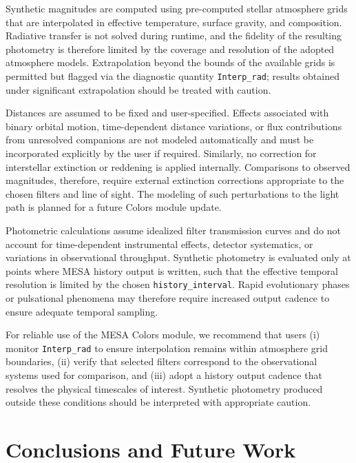 \documentclass[linenumbers,apj,twocolumn, floatfix]{aastex701}
\begin{document}
Synthetic magnitudes are computed using pre-computed stellar atmosphere grids that are interpolated in effective temperature, surface gravity, and composition.
Radiative transfer is not solved during runtime, and the fidelity of the resulting photometry is therefore limited by the coverage and resolution of the adopted atmosphere models.
Extrapolation beyond the bounds of the available grids is permitted but flagged via the diagnostic quantity \texttt{Interp\_rad}; results obtained under significant extrapolation should be treated with caution.

Distances are assumed to be fixed and user-specified.
Effects associated with binary orbital motion, time-dependent distance variations, or flux contributions from unresolved companions are not modeled automatically and must be incorporated explicitly by the user if required.
Similarly, no correction for interstellar extinction or reddening is applied internally.
Comparisons to observed magnitudes, therefore, require external extinction corrections appropriate to the chosen filters and line of sight.
The modeling of such perturbations to the light path is planned for a future Colors module update.

Photometric calculations assume idealized filter transmission curves and do not account for time-dependent instrumental effects, detector systematics, or variations in observational throughput.
Synthetic photometry is evaluated only at points where MESA history output is written, such that the effective temporal resolution is limited by the chosen \texttt{history\_interval}.
Rapid evolutionary phases or pulsational phenomena may therefore require increased output cadence to ensure adequate temporal sampling.


For reliable use of the MESA Colors module, we recommend that users (i) monitor \texttt{Interp\_rad} to ensure interpolation remains within atmosphere grid boundaries, (ii) verify that selected filters correspond to the observational systems used for comparison, and (iii) adopt a history output cadence that resolves the physical timescales of interest.
Synthetic photometry produced outside these conditions should be interpreted with appropriate caution.

\section{Conclusions and Future Work}
\label{sec:conclusions}
\end{document}

